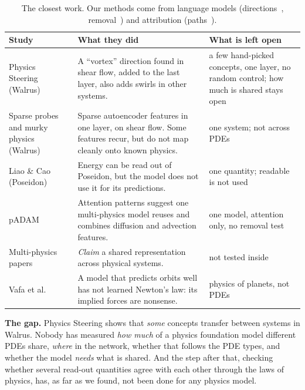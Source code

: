 \documentclass[11pt,a4paper]{article}
\begin{document}
\begin{table}[htbp]
\centering
\renewcommand{\arraystretch}{1.55}
\small
\begin{tabularx}{\textwidth}{>{\raggedright\arraybackslash}p{3.6cm} >{\raggedright\arraybackslash}X >{\raggedright\arraybackslash}p{3.6cm}}
\toprule
\textbf{Study} & \textbf{What they did} & \textbf{What is left open} \\
\midrule
Physics Steering~\cite{fear2025} (Walrus) & A ``vortex'' direction found in shear flow, added to the last layer, also adds swirls in other systems.
  & a few hand-picked concepts, one layer, no random control; how much is shared stays open \\
Sparse probes and murky physics~\cite{rosenfeld2026} (Walrus) & Sparse autoencoder features in one layer, on shear flow.
  Some features recur, but do not map cleanly onto known physics. & one system; not across PDEs \\
Liao \& Cao~\cite{liao2026} (Poseidon) & Energy can be read out of Poseidon, but the model does not use it for its predictions.
  & one quantity; readable is not used \\
pADAM~\cite{padam} & Attention patterns suggest one multi-physics model reuses and combines diffusion and advection features.
  & one model, attention only, no removal test \\
Multi-physics papers~\cite{mpp, unsupadapt} & \emph{Claim} a shared representation across physical systems. & not tested inside \\
Vafa et al.~\cite{vafa} & A model that predicts orbits well has not learned Newton's law: its implied forces are nonsense.
  & physics of planets, not PDEs \\
\bottomrule
\end{tabularx}
\caption{The closest work. Our methods come from language models (directions~\cite{chang2022}, removal~\cite{saha2026})
and attribution (paths~\cite{dhamdhere2019, dreyer2024}).}
\end{table}

\textbf{The gap.} Physics Steering shows that \emph{some} concepts transfer between systems in Walrus.
Nobody has measured \emph{how much} of a physics foundation model different PDEs share, \emph{where} in the network,
whether that follows the PDE types, and whether the model \emph{needs} what is shared.
And the step after that, checking whether several read-out quantities agree with each other through the laws of physics,
has, as far as we found, not been done for any physics model.
\end{document}
